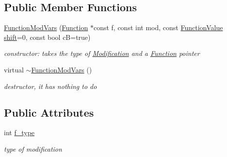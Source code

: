 \subsection*{Public Member Functions}
\begin{DoxyCompactItemize}
\item 
\mbox{\hyperlink{class_s_m_spp__di__unipi__it_1_1_function_mod_vars_a78ac9112c0a12acc7508bd038c75b81c}{Function\+Mod\+Vars}} (\mbox{\hyperlink{class_s_m_spp__di__unipi__it_1_1_function}{Function}} $\ast$const f, const int mod, const \mbox{\hyperlink{class_s_m_spp__di__unipi__it_1_1_function_mod_a44f54e31f9fa8a29194218c234876284}{Function\+Value}} \mbox{\hyperlink{class_s_m_spp__di__unipi__it_1_1_function_mod_a177a0111cf0d0fdc5409df06c3b5e282}{shift}}=0, const bool cB=true)
\begin{DoxyCompactList}\small\item\em constructor\+: takes the type of \mbox{\hyperlink{class_s_m_spp__di__unipi__it_1_1_modification}{Modification}} and a \mbox{\hyperlink{class_s_m_spp__di__unipi__it_1_1_function}{Function}} pointer \end{DoxyCompactList}\item 
\mbox{\label{class_s_m_spp__di__unipi__it_1_1_function_mod_vars_acb835b05aa1cd5ca9ca008eaec2e449a}} 
virtual \mbox{\hyperlink{class_s_m_spp__di__unipi__it_1_1_function_mod_vars_acb835b05aa1cd5ca9ca008eaec2e449a}{$\sim$\+Function\+Mod\+Vars}} ()
\begin{DoxyCompactList}\small\item\em destructor, it has nothing to do \end{DoxyCompactList}\end{DoxyCompactItemize}
\subsection*{Public Attributes}
\begin{DoxyCompactItemize}
\item 
\mbox{\label{class_s_m_spp__di__unipi__it_1_1_function_mod_vars_a102e30a031044d9e821316a075e882b1}} 
int \mbox{\hyperlink{class_s_m_spp__di__unipi__it_1_1_function_mod_vars_a102e30a031044d9e821316a075e882b1}{f\+\_\+type}}
\begin{DoxyCompactList}\small\item\em type of modification \end{DoxyCompactList}\end{DoxyCompactItemize}
